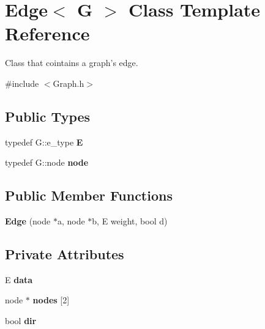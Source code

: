 \hypertarget{classEdge}{\section{\-Edge$<$ \-G $>$ \-Class \-Template \-Reference}
\label{classEdge}
}


\-Class that cointains a graph's edge.  




{\ttfamily \#include $<$\-Graph.\-h$>$}

\subsection*{\-Public \-Types}
\begin{DoxyCompactItemize}
\item 
\hypertarget{classEdge_a2ce43787051a876f97bd7268d686212f}{typedef \-G\-::e\-\_\-type {\bfseries \-E}}\label{classEdge_a2ce43787051a876f97bd7268d686212f}

\item 
\hypertarget{classEdge_a35196d53c902931172364e3a8b03fee9}{typedef \-G\-::node {\bfseries node}}\label{classEdge_a35196d53c902931172364e3a8b03fee9}

\end{DoxyCompactItemize}
\subsection*{\-Public \-Member \-Functions}
\begin{DoxyCompactItemize}
\item 
\hypertarget{classEdge_ad30fa5cd25863785dc1fca28140b5ac1}{{\bfseries \-Edge} (node $\ast$a, node $\ast$b, \-E weight, bool d)}\label{classEdge_ad30fa5cd25863785dc1fca28140b5ac1}

\end{DoxyCompactItemize}
\subsection*{\-Private \-Attributes}
\begin{DoxyCompactItemize}
\item 
\hypertarget{classEdge_ae0071d92a50456166e4ef19378467449}{\-E {\bfseries data}}\label{classEdge_ae0071d92a50456166e4ef19378467449}

\item 
\hypertarget{classEdge_ab93b5172c82441d38be2ab0a7adfae14}{node $\ast$ {\bfseries nodes} \mbox{[}2\mbox{]}}\label{classEdge_ab93b5172c82441d38be2ab0a7adfae14}

\item 
\hypertarget{classEdge_ae4355360a2ff8e420301f39cdf311622}{bool {\bfseries dir}}\label{classEdge_ae4355360a2ff8e420301f39cdf311622}

\end{DoxyCompactItemize}
